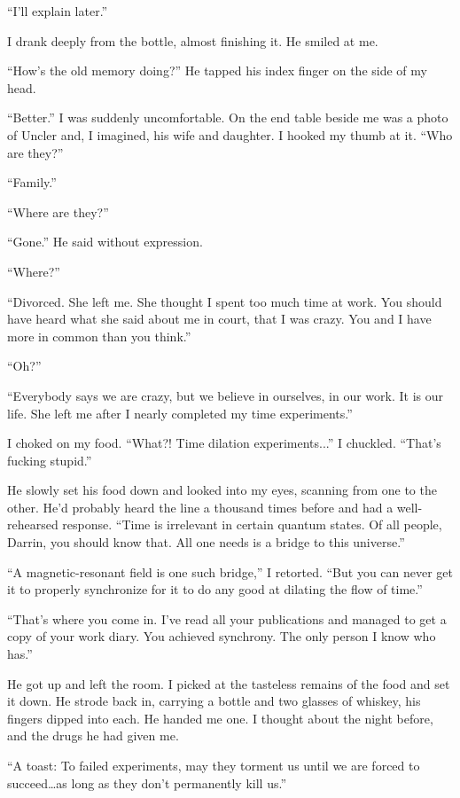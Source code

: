 ``I'll explain later.''

I drank deeply from the bottle, almost finishing it. He smiled at me.

``How's the old memory doing?'' He tapped his index finger on the side
of my head.

``Better.'' I was suddenly uncomfortable. On the end table beside me was
a photo of Uncler and, I imagined, his wife and daughter. I hooked my
thumb at it. ``Who are they?''

``Family.''

``Where are they?''

``Gone.'' He said without expression.

``Where?''

``Divorced. She left me. She thought I spent too much time at work. You
should have heard what she said about me in court, that I was crazy. You
and I have more in common than you think.''

``Oh?''

``Everybody says we are crazy, but we believe in ourselves, in our work.
It is our life. She left me after I nearly completed my time
experiments.''

I choked on my food. ``What?! Time dilation experiments...'' I chuckled.
``That's fucking stupid.''

He slowly set his food down and looked into my eyes, scanning from one
to the other. He'd probably heard the line a thousand times before and
had a well-rehearsed response. ``Time is irrelevant in certain quantum
states. Of all people, Darrin, you should know that. All one needs is a
bridge to this universe.''

``A magnetic-resonant field is one such bridge,'' I retorted. ``But you
can never get it to properly synchronize for it to do any good at
dilating the flow of time.''

``That's where you come in. I've read all your publications and managed
to get a copy of your work diary. You achieved synchrony. The only
person I know who has.''

He got up and left the room. I picked at the tasteless remains of the
food and set it down. He strode back in, carrying a bottle and two
glasses of whiskey, his fingers dipped into each. He handed me one. I
thought about the night before, and the drugs he had given me.

``A toast: To failed experiments, may they torment us until we are
forced to succeed\ldots as long as they don't permanently kill us.''

